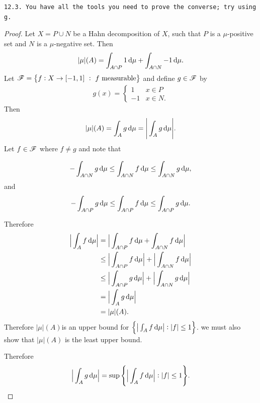 \begin{verbatim}
12.3. You have all the tools you need to prove the converse; try using g.
\end{verbatim}

\begin{proof}
  Let $X = P \cup N$ be a Hahn decomposition of $X$, such that $P$ is a $\mu$-positive set and $N$ is
  a $\mu$-negative set. Then
  \begin{align*}
    |\mu|(A) =\int_{A\cap P} 1 \dmu + \int_{A \cap N} -1 \dmu.
  \end{align*}
  Let $\mathscr F = \big\{f: X \to [-1, 1] ~: ~ f \text{~measurable} \big\}$ and define $g \in \mathscr F$ by
  \begin{align*}
    g(x) =
    \begin{cases}
      1  & x \in P \\
      -1 & x \in N.
    \end{cases}
  \end{align*}
  Then
  \begin{align*}
    |\mu|(A) = \int_A g \dmu = \Bigg|\int_A g \dmu\Bigg|.
  \end{align*}
  Let $f \in \mathscr F$ where $f \neq g$ and note that

  \begin{align*}
    -\int_{A \cap N} g \dmu \leq \int_{A \cap N} f \dmu \leq \int_{A \cap N} g \dmu,
  \end{align*}
  and
  \begin{align*}
    -\int_{A \cap P} g \dmu \leq \int_{A \cap P} f \dmu \leq \int_{A \cap P} g \dmu.
  \end{align*}

  Therefore
  \begin{align*}
    \Big|\int_A f \dmu\Big|
    &= \Big|\int_{A \cap P} f \dmu + \int_{A \cap N} f \dmu\Big| \\
    &\leq \Big|\int_{A \cap P} f \dmu\Big| + \Big|\int_{A \cap N} f \dmu\Big| \\
    &\leq \Big|\int_{A \cap P} g \dmu\Big| + \Big|\int_{A \cap N} g \dmu\Big| \\
    &= \Big|\int_{A} g \dmu\Big| \\
    &= |\mu|(A).
  \end{align*}
  Therefore $|\mu|(A)$is an upper bound for $\Big\{ \big|\int_A f \dmu\big| : |f| \leq 1 \Big\}$.
   we must also show that $|\mu|(A)$ is the least upper bound.

  Therefore
  \begin{align*}
    \Big|\int_{A} g \dmu\Big| = \sup\Bigg\{ \Big|\int_A f \dmu\Big| : |f| \leq 1 \Bigg\}.
  \end{align*}
\end{proof}


